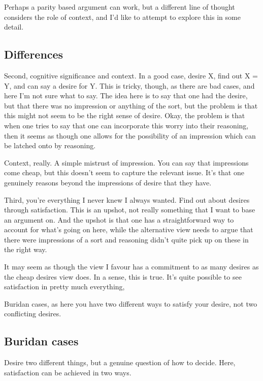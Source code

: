 \documentclass[10pt]{article}
\begin{document}
Perhaps a parity based argument can work, but a different line of thought considers the role of context, and I'd like to attempt to explore this in some detail.



\subsection{Differences}
\label{sec:differences}



Second, cognitive significance and context.
In a good case, desire X, find out X = Y, and can say a desire for Y.
This is tricky, though, as there are bad cases, and here I'm not sure what to say.
The idea here is to say that one had the desire, but that there was no impression or anything of the sort, but the problem is that this might not seem to be the right sense of desire.
Okay, the problem is that when one tries to say that one can incorporate this worry into their reasoning, then it seems as though one allows for the possibility of an impression which can be latched onto by reasoning.


Context, really.
A simple mistrust of impression.
You can say that impressions come cheap, but this doesn't seem to capture the relevant issue.
It's that one genuinely reasons beyond the impressions of desire that they have.


Third, you're everything I never knew I always wanted.
Find out about desires through satisfaction.
This is an upshot, not really something that I want to base an argument on.
And the upshot is that one has a straightforward way to account for what's going on here, while the alternative view needs to argue that there were impressions of a sort and reasoning didn't quite pick up on these in the right way.

It may seem as though the view I favour has a commitment to as many desires as the cheap desires view does.
In a sense, this is true.
It's quite possible to see satisfaction in pretty much everything,



Buridan cases, as here you have two different ways to satisfy your desire, not two conflicting desires.


\subsection{Buridan cases}
\label{sec:buridan-cases}

Desire two different things, but a genuine question of how to decide.
Here, satisfaction can be achieved in two ways.
\end{document}
